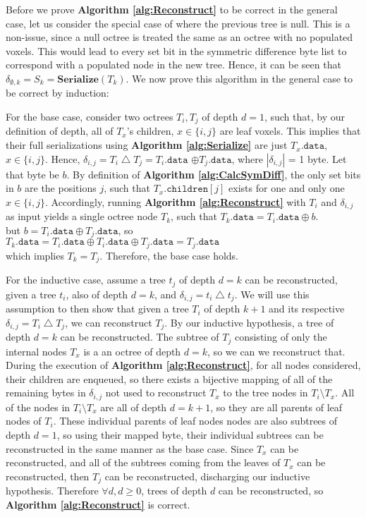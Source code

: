 \documentclass[twoside,twocolumn]{article}
\newcommand{\symdiff}{\ensuremath{\bigtriangleup}}
\begin{document}
Before we prove \textbf{Algorithm \ref{alg:Reconstruct}} to be correct in the general case, let us consider
the special case of where the previous tree is null. This is a non-issue, since a null octree is
treated the same as an octree with no populated voxels. This would lead to every set bit in the
symmetric difference byte list to correspond with a populated node in the new tree. Hence, it can be seen
that $\delta_{\emptyset,k} = S_k = \mathbf{Serialize}(T_k)$. We now prove this algorithm in the general
case to be correct by induction:

For the base case, consider two octrees $T_i, T_j$ of depth $d = 1$, such that, by our definition of depth,
all of $T_x$'s children, $x \in \{i,j\}$ are leaf voxels. This implies that their full serializations
using \textbf{Algorithm \ref{alg:Serialize}} are just $T_x.\mathtt{data}$, $x \in \{i,j\}$.
Hence, $\delta_{i,j} = T_i \symdiff T_j = T_i.\mathtt{data}$ $\oplus T_j.\mathtt{data}$,
where $|\delta_{i,j}|$ = 1 byte. Let that byte be $b$. By definition of
\textbf{Algorithm \ref{alg:CalcSymDiff}}, the only set bits in $b$ are the positions $j$, such that
$T_x.\mathtt{children}[j]$ exists for one and only one $x \in \{i,j\}$.
Accordingly, running \textbf{Algorithm \ref{alg:Reconstruct}} with $T_i$ and $\delta_{i,j}$ as input
yields a single octree node $T_k$, such that $T_k.\mathtt{data} = T_i.\mathtt{data} \oplus b$.\\
but $b = T_i.\mathtt{data} \oplus T_j.\mathtt{data}$, so\\
$T_k.\mathtt{data} = T_i.\mathtt{data} \oplus T_i.\mathtt{data} \oplus T_j.\mathtt{data}
= T_j.\mathtt{data}$\\
which implies $T_k = T_j$.
Therefore, the base case holds.

For the inductive case, assume a tree $t_j$ of depth $d = k$ can be reconstructed, given a tree $t_i$,
also of depth $d = k$, and $\delta_{i,j} = t_i \symdiff t_j$. We will use this assumption to then show
that given a tree $T_i$ of depth $k + 1$ and its respective $\delta_{i,j} = T_i \symdiff T_j$, we can
reconstruct $T_j$. By our inductive hypothesis, a tree of depth $d = k$ can be reconstructed. The subtree
of $T_j$ consisting of only the internal nodes $T_x$ is a an octree of depth $d = k$, so we can we
reconstruct that. During the execution of \textbf{Algorithm \ref{alg:Reconstruct}}, for all nodes
considered, their children are enqueued, so there exists a bijective mapping of all of the remaining
bytes in $\delta_{i,j}$ not used to reconstruct $T_x$ to the tree nodes in $T_i \setminus T_x$.
All of the nodes in $T_i \setminus T_x$ are all of depth $d = k + 1$, so they are all parents of leaf
nodes of $T_i$. These individual parents of leaf nodes nodes are also subtrees of depth $d = 1$, so using
their mapped byte, their individual subtrees can be reconstructed in the same manner as the base case.
Since $T_x$ can be reconstructed, and all of the subtrees coming from the leaves of $T_x$ can be
reconstructed, then $T_j$ can be reconstructed, discharging our inductive hypothesis.
Therefore $\forall d, d \geq 0$, trees of depth $d$ can be reconstructed, so
\textbf{Algorithm \ref{alg:Reconstruct}} is correct.
\end{document}
